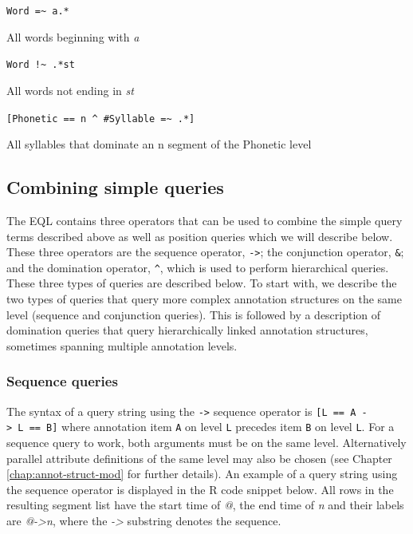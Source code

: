 \documentclass[]{book}
\begin{document}
\texttt{Word\ =\textasciitilde{}\ a.*}

All words beginning with \emph{a}

\texttt{Word\ !\textasciitilde{}\ .*st}

All words not ending in \emph{st}

\texttt{{[}Phonetic\ ==\ n\ \^{}\ \#Syllable\ =\textasciitilde{}\ .*{]}}

All syllables that dominate an n segment of the Phonetic level

\hypertarget{combining-simple-queries}{%
\subsection{Combining simple queries}\label{combining-simple-queries}}

The EQL contains three operators that can be used to combine the simple query terms described above as well as position queries which we will describe below. These three operators are the sequence operator, \texttt{-\textgreater{}}; the conjunction operator, \texttt{\&}; and the domination operator, \texttt{\^{}}, which is used to perform hierarchical queries. These three types of queries are described below. To start with, we describe the two types of queries that query more complex annotation structures on the same level (sequence and conjunction queries). This is followed by a description of domination queries that query hierarchically linked annotation structures, sometimes spanning multiple annotation levels.

\hypertarget{sequence-queries}{%
\subsubsection{Sequence queries}\label{sequence-queries}}

The syntax of a query string using the \texttt{-\textgreater{}} sequence operator is \texttt{{[}L\ ==\ A\ -\textgreater{}\ L\ ==\ B{]}} where annotation item \texttt{A} on level \texttt{L} precedes item \texttt{B} on level \texttt{L}. For a sequence query to work, both arguments must be on the same level. Alternatively parallel attribute definitions of the same level may also be chosen (see Chapter \ref{chap:annot-struct-mod} for further details). An example of a query string using the sequence operator is displayed in the R code snippet below. All rows in the resulting segment list have the start time of \emph{@}, the end time of \emph{n} and their labels are \emph{@-\textgreater{}n}, where the \emph{-\textgreater{}} substring denotes the sequence.
\end{document}
